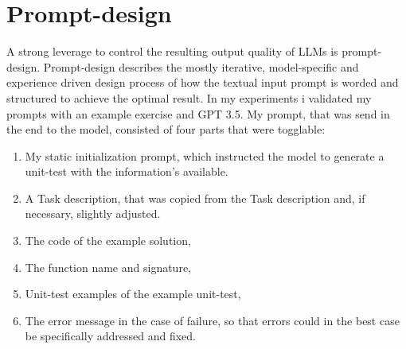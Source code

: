 \documentclass[a4paper,11pt,oneside]{memoir}
\begin{document}
\section{Prompt-design}
A strong leverage to control the resulting output quality of LLMs is prompt-design. Prompt-design describes the mostly iterative, model-specific and experience driven design process of how the textual input prompt is worded and structured to achieve the optimal result.
In my experiments i validated my prompts with an example exercise and GPT 3.5. 
My prompt, that was send in the end to the model, consisted of four parts that were togglable:
\begin{enumerate}
\item My static initialization prompt, which instructed the model to generate a unit-test with the information's available.
\item A Task description, that was copied from the Task description and, if necessary, slightly adjusted.
\item The code of the example solution, 
\item The function name and signature,
\item Unit-test examples of the example unit-test,
\item The error message in the case of failure, so that errors could in the best case be specifically addressed and fixed.
\end{enumerate}
\end{document}
